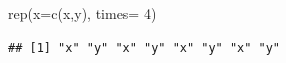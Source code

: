 \documentclass[
]{book}
\newenvironment{Shaded}{\begin{snugshade}}{\end{snugshade}}
\newcommand{\AttributeTok}[1]{\textcolor[rgb]{0.77,0.63,0.00}{#1}}
\newcommand{\DecValTok}[1]{\textcolor[rgb]{0.00,0.00,0.81}{#1}}
\newcommand{\FunctionTok}[1]{\textcolor[rgb]{0.00,0.00,0.00}{#1}}
\newcommand{\NormalTok}[1]{#1}
\newcommand{\StringTok}[1]{\textcolor[rgb]{0.31,0.60,0.02}{#1}}
\begin{document}
\begin{Shaded}
\begin{Highlighting}[]
\FunctionTok{rep}\NormalTok{(}\AttributeTok{x=}\FunctionTok{c}\NormalTok{(}\StringTok{\textquotesingle{}x\textquotesingle{}}\NormalTok{,}\StringTok{\textquotesingle{}y\textquotesingle{}}\NormalTok{), }\AttributeTok{times=} \DecValTok{4}\NormalTok{)}
\end{Highlighting}
\end{Shaded}

\begin{verbatim}
## [1] "x" "y" "x" "y" "x" "y" "x" "y"
\end{verbatim}

  
\end{document}
